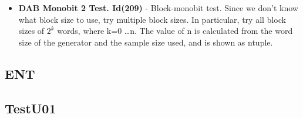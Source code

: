 \begin{itemize}
   \item \textbf{DAB Monobit 2 Test. Id(209)} - Block-monobit test. Since we don't know what block size to use, try multiple block sizes. In particular, try all block sizes of $2^k$ words, where k={0 \dots n}.  The value of n is calculated from the word size of the generator and the sample size used, and is shown as ntuple.
 \end{itemize} 

  \subsection{ENT}
  
  \subsection{TestU01}
  

\begin{center}
\end{center}

